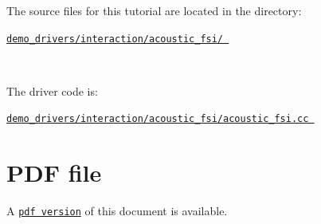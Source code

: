 \begin{DoxyItemize}
\item The source files for this tutorial are located in the directory\+:~\newline
~\newline
 \begin{center} \href{../../../../demo_drivers/interaction/acoustic_fsi}{\tt demo\+\_\+drivers/interaction/acoustic\+\_\+fsi/ } \end{center} ~\newline

\item The driver code is\+: ~\newline
~\newline
 \begin{center} \href{../../../../demo_drivers/interaction/acoustic_fsi/acoustic_fsi.cc}{\tt demo\+\_\+drivers/interaction/acoustic\+\_\+fsi/acoustic\+\_\+fsi.\+cc } \end{center} 
\end{DoxyItemize}



 

 \hypertarget{index_pdf}{}\section{P\+D\+F file}\label{index_pdf}
A \href{../latex/refman.pdf}{\tt pdf version} of this document is available. 
